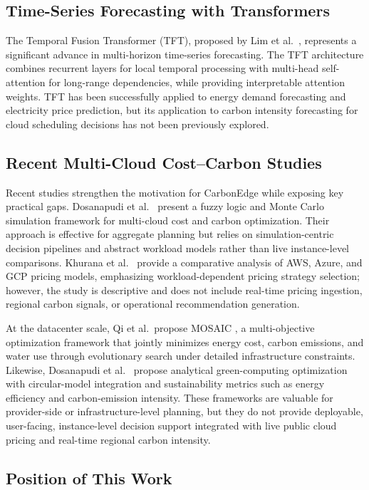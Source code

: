 \documentclass[conference]{IEEEtran}
\begin{document}
\subsection{Time-Series Forecasting with Transformers}

The Temporal Fusion Transformer (TFT), proposed by Lim et al.\ \cite{b15}, represents a significant advance in multi-horizon time-series forecasting. The TFT architecture combines recurrent layers for local temporal processing with multi-head self-attention for long-range dependencies, while providing interpretable attention weights. TFT has been successfully applied to energy demand forecasting \cite{b16} and electricity price prediction, but its application to carbon intensity forecasting for cloud scheduling decisions has not been previously explored.

\subsection{Recent Multi-Cloud Cost--Carbon Studies}

Recent studies strengthen the motivation for CarbonEdge while exposing key practical gaps. Dosanapudi et al.\ \cite{b17} present a fuzzy logic and Monte Carlo simulation framework for multi-cloud cost and carbon optimization. Their approach is effective for aggregate planning but relies on simulation-centric decision pipelines and abstract workload models rather than live instance-level comparisons. Khurana et al.\ \cite{b18} provide a comparative analysis of AWS, Azure, and GCP pricing models, emphasizing workload-dependent pricing strategy selection; however, the study is descriptive and does not include real-time pricing ingestion, regional carbon signals, or operational recommendation generation.

At the datacenter scale, Qi et al.\ propose MOSAIC \cite{b19}, a multi-objective optimization framework that jointly minimizes energy cost, carbon emissions, and water use through evolutionary search under detailed infrastructure constraints. Likewise, Dosanapudi et al.\ \cite{b20} propose analytical green-computing optimization with circular-model integration and sustainability metrics such as energy efficiency and carbon-emission intensity. These frameworks are valuable for provider-side or infrastructure-level planning, but they do not provide deployable, user-facing, instance-level decision support integrated with live public cloud pricing and real-time regional carbon intensity.

\subsection{Position of This Work}
\end{document}

